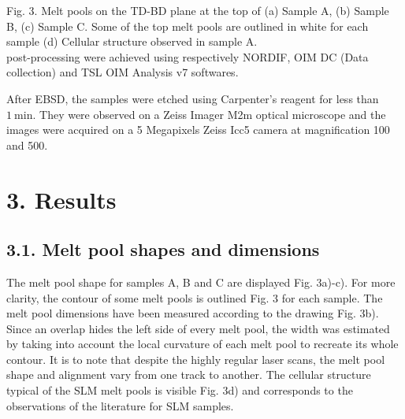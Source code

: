 \documentclass[10pt]{article}
\begin{document}
Fig. 3. Melt pools on the TD-BD plane at the top of (a) Sample A, (b) Sample B, (c) Sample C. Some of the top melt pools are outlined in white for each sample (d) Cellular structure observed in sample A.\\
post-processing were achieved using respectively NORDIF, OIM DC (Data collection) and TSL OIM Analysis v7 softwares.

After EBSD, the samples were etched using Carpenter's reagent for less than $1 \mathrm{~min}$. They were observed on a Zeiss Imager M2m optical microscope and the images were acquired on a 5 Megapixels Zeiss Icc5 camera at magnification 100 and 500.

\section*{3. Results}
\subsection*{3.1. Melt pool shapes and dimensions}
The melt pool shape for samples A, B and C are displayed Fig. 3a)-c). For more clarity, the contour of some melt pools is outlined Fig. 3 for each sample. The melt pool dimensions have been measured according to the drawing Fig. 3b). Since an overlap hides the left side of every melt pool, the width was estimated by taking into account the local curvature of each melt pool to recreate its whole contour. It is to note that despite the highly regular laser scans, the melt pool shape and alignment vary from one track to another. The cellular structure typical of the SLM melt pools is visible Fig. 3d) and corresponds to the observations of the literature for SLM samples.
\end{document}
